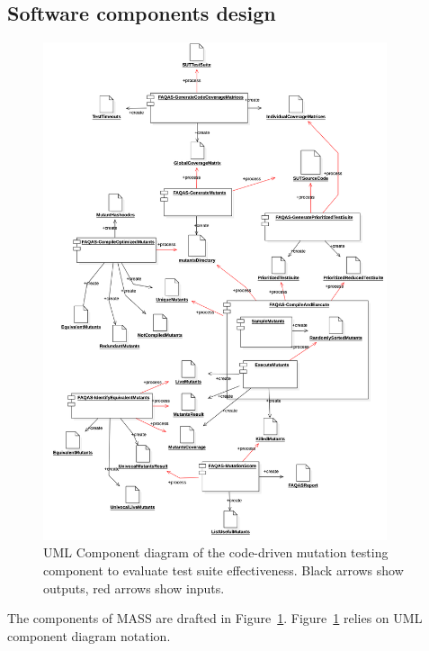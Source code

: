 \clearpage

\subsection{Software components design}
\label{sec:component:design}
\begin{figure}[tb]
  \centering
	\includegraphics[width=0.9\textwidth]{images/component.png}
      \caption{UML Component diagram of the code-driven mutation testing component to evaluate test suite effectiveness. Black arrows show outputs, red arrows show inputs.}
      \label{fig:component_diagram}
\end{figure}

The components of MASS are drafted in Figure~\ref{fig:component_diagram}. Figure~\ref{fig:component_diagram} relies on UML component diagram notation.

